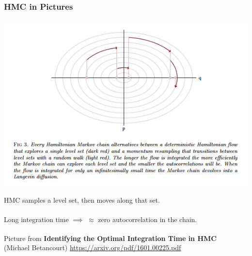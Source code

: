 \documentclass[xcolor=dvipsnames]{beamer}
\begin{document}
\begin{frame}
\frametitle{HMC in Pictures}
\begin{center}
\includegraphics[height=0.5\textheight]{hmc.png}
\end{center}

HMC samples a level set, then moves along that set.\\~\\


Long integration time $\implies$ $\approx$ zero autocorrelation in the chain.\\~\\

{\footnotesize Picture from \textbf{Identifying the Optimal Integration Time in HMC}\\ (Michael Betancourt)
\url{https://arxiv.org/pdf/1601.00225.pdf}}
\end{frame}
\end{document}
